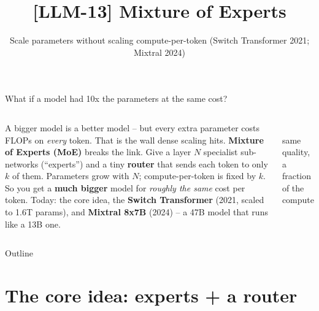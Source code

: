\documentclass[aspectratio=169]{beamer}
\title{[LLM-13] Mixture of Experts}
\subtitle{Scale parameters without scaling compute-per-token \quad(Switch Transformer 2021; Mixtral 2024)}
\date{}
\begin{document}
\begin{frame}{What if a model had 10x the parameters at the same cost?}
  \begin{columns}[T]
    A bigger model is a better model -- but every extra parameter costs FLOPs on
    \emph{every} token. That is the wall dense scaling hits.
    \vskip 8pt
    \textbf{Mixture of Experts (MoE)} breaks the link. Give a layer $N$ specialist
    sub-networks (``experts'') and a tiny \textbf{router} that sends each token to only
    \textbf{$k$} of them.
    \vskip 8pt
    Parameters grow with $N$; compute-per-token is fixed by $k$. So you get a
    \textbf{much bigger} model for \emph{roughly the same} cost per token.
    \vskip 8pt
    Today: the core idea, the \textbf{Switch Transformer} (2021, scaled to 1.6T params),
    and \textbf{Mixtral 8x7B} (2024) -- a 47B model that runs like a 13B one.
    \begin{center}
      \\[4pt]
      {\scriptsize same quality, a fraction of the compute}
    \end{center}
  \end{columns}
\end{frame}

\begin{frame}{Outline}
  \tableofcontents
\end{frame}

\section{The core idea: experts + a router}
\end{document}
